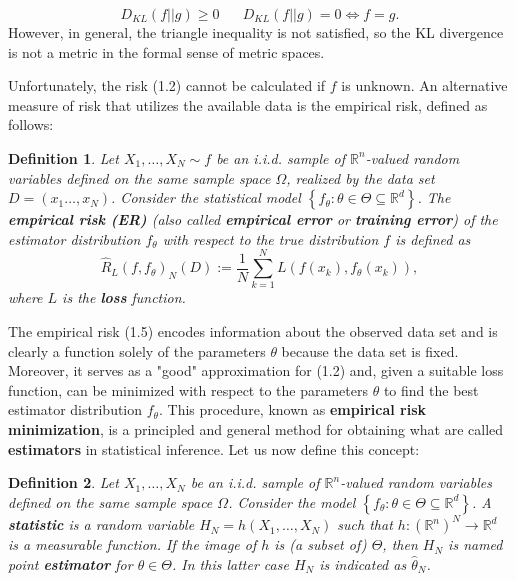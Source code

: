 \documentclass{report}
\newtheorem{definition}{Definition}[chapter]
\begin{document}
\begin{equation}
 D_{KL}(f||g) \geq 0\,\,\,\,\,\,\,\,\,\, D_{KL}(f||g) = 0 \iff f = g.
\end{equation}
However, in general, the triangle inequality is not satisfied, so the KL divergence is not a metric in the formal sense of metric spaces.

Unfortunately, the risk (1.2) cannot be calculated if $f$ is unknown. An alternative measure of risk that utilizes the available data is the empirical risk, defined as follows:

\begin{definition}
Let $X_1,\dots,X_N \sim f$ be an i.i.d. sample of $\mathbb{R}^n$-valued random variables defined on the same sample space $\Omega$, realized by the data set $D = (x_1\dots,x_N)$. Consider the statistical model $\left\{f_\theta : \theta \in \Theta \subseteq \mathbb{R}^d\right\}$. The \textbf{empirical risk (ER)} (also called \textbf{empirical error} or \textbf{training error}) of the estimator distribution $f_\theta$ with respect to the true distribution $f$ is defined as
\begin{equation}
\hat{R}_L(f,f_\theta)_N(D) := \frac{1}{N}\sum_{k=1}^{N}L(f(x_k),f_\theta(x_k)),
\end{equation}
where $L$ is the \textbf{loss} function.
\end{definition}

The empirical risk (1.5) encodes information about the observed data set and is clearly a function solely of the parameters $\theta$ because the data set is fixed. Moreover, it serves as a "good" approximation for (1.2) and, given a suitable loss function, can be minimized with respect to the parameters $\theta$ to find the best estimator distribution $f_\theta$. This procedure, known as \textbf{empirical risk minimization}, is a principled and general method for obtaining what are called \textbf{estimators} in statistical inference. Let us now define this concept:

\begin{definition}
Let $X_1,\dots,X_N$ be an i.i.d. sample of $\mathbb{R}^n$-valued random variables defined on the same sample space $\Omega$. Consider the model $\left\{f_\theta : \theta \in \Theta \subseteq \mathbb{R}^d\right \}$. A \textbf{statistic} is a random variable $H_N = h(X_1,\dots,X_N)$ such that $h : (\mathbb{R}^n)^N \to \mathbb{R}^d$ is a measurable function. If the image of $h$ is (a subset of) $\Theta$, then $H_N$ is named point \textbf{estimator} for $\theta \in \Theta$. In this latter case $H_N$ is indicated as $\hat{\theta}_N$.
\end{definition}
\end{document}
